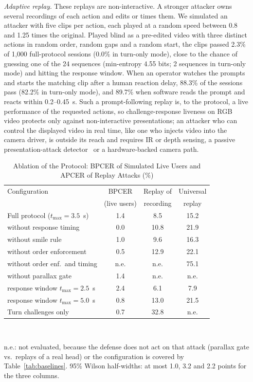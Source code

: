 \documentclass{ieeeaccess}
\begin{document}
\emph{Adaptive replay.} These replays are non-interactive. A stronger attacker owns several recordings of each action and edits or times them. We simulated an attacker with five clips per action, each played at a random speed between 0.8 and 1.25 times the original. Played blind as a pre-edited video with three distinct actions in random order, random gaps and a random start, the clips passed 2.3\% of 1,000 full-protocol sessions (0.0\% in turn-only mode), close to the chance of guessing one of the 24 sequences (min-entropy 4.55 bits; 2 sequences in turn-only mode) and hitting the response window. When an operator watches the prompts and starts the matching clip after a human reaction delay, 88.3\% of the sessions pass (82.2\% in turn-only mode), and 89.7\% when software reads the prompt and reacts within 0.2--0.45~s. Such a prompt-following replay is, to the protocol, a live performance of the requested actions, so challenge-response liveness on RGB video protects only against non-interactive presentations; an attacker who can control the displayed video in real time, like one who injects video into the camera driver, is outside its reach and requires IR or depth sensing, a passive presentation-attack detector~\cite{yu2023fassurvey} or a hardware-backed camera path.

\begin{table}[!t]
\centering
\caption{Ablation of the Protocol: BPCER of Simulated Live Users and APCER of Replay Attacks (\%)}
\label{tab:replay}
\footnotesize
\setlength{\tabcolsep}{2.5pt}
\begin{tabular}{@{}lccc@{}}
\toprule
Configuration & BPCER & Replay of & Universal \\
 & (live users) & recording & replay \\
\midrule
Full protocol ($t_{\max}=3.5$~s) & 1.4& 8.5& 15.2\\
\quad without response timing & 0.0& 10.8& 21.9\\
\quad without smile rule & 1.0& 9.6& 16.3\\
\quad without order enforcement & 0.5& 12.9& 22.1\\
\quad without order enf.\ and timing & n.e. & n.e. & 75.1\\
\quad without parallax gate & 1.4& n.e. & n.e. \\
\quad response window $t_{\max}=2.5$~s & 2.4& 6.1& 7.9\\
\quad response window $t_{\max}=5.0$~s & 0.8& 13.0& 21.5\\
Turn challenges only & 0.7& 32.8& n.e. \\
\bottomrule
\end{tabular}\\[2pt]
\raggedright\scriptsize n.e.: not evaluated, because the defense does not act on that attack (parallax gate vs.\ replays of a real head) or the configuration is covered by Table~\ref{tab:baselines}. 95\% Wilson half-widths: at most 1.0, 3.2 and 2.2 points for the three columns.
\end{table}
\end{document}

